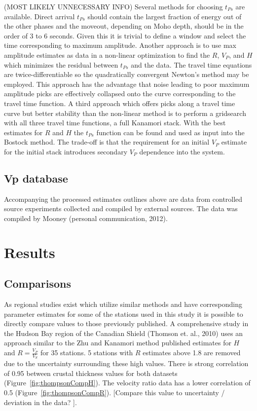 \documentclass[draft, 12pt]{article}
\begin{document}
(MOST LIKELY UNNECESSARY INFO)
Several methods for choosing $t_{Ps}$ are available. Direct arrival $t_{Ps}$ should contain the largest fraction of energy out of the other phases and the moveout, depending on Moho depth, should be in the order of 3 to 6 seconds. Given this it is trivial to define a window and select the time corresponding to maximum amplitude. Another approach is to use max amplitude estimates as data in a non-linear optimization to find the $R$, $V_P$, and $H$ which minimizes the residual between $t_{Ps}$ and the data. The travel time equations are twice-differentiable so the quadratically convergent Newton's method may be employed. This approach has the advantage that noise leading to poor maximum amplitude picks are effectively collapsed onto the curve corresponding to the travel time function. A third approach which offers picks along a travel time curve but better stability than the non-linear method is to perform a gridsearch with all three travel time functions, a full Kanamori stack. With the best estimates for $R$ and $H$ the $t_{Ps}$ function can be found and used as input into the Bostock method. The trade-off is that the requirement for an initial $V_P$ estimate for the initial stack introduces secondary $V_P$ dependence into the system.

\subsection{Vp database}
   Accompanying the processed estimates outlines above are data from controlled source experiments collected and compiled by external sources. The data was compiled by Mooney (personal communication, 2012).


\section{Results}

\subsection{Comparisons}
As regional studies exist which utilize similar methods and have corresponding parameter estimates for some of the stations used in this study it is possible to directly compare values to those previously published. A comprehensive study in the Hudson Bay region of the Canadian Shield (Thomson et. al., 2010) uses an approach similar to the Zhu and Kanamori method published estimates for $H$ and $R=\frac{V_P}{V_S}$ for 35 stations. 5 stations with $R$ estimates above 1.8 are removed due to the uncertainty surrounding these high values. There is strong correlation of 0.95 between crustal thickness values for both datasets (Figure~\ref{fig:thompsonCompH}). The velocity ratio data has a lower correlation of 0.5 (Figure~\ref{fig:thompsonCompR}). [Compare this value to uncertainty / deviation in the data? ].
\end{document}

